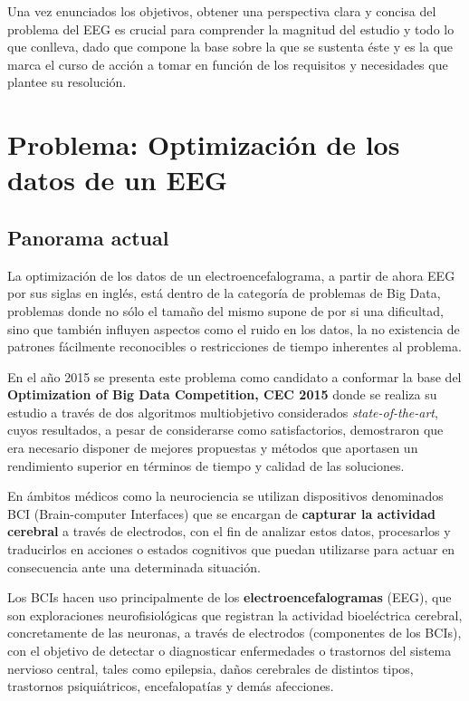 Una vez enunciados los objetivos, obtener una perspectiva clara y concisa del problema del EEG es crucial para comprender la magnitud del estudio y todo lo que conlleva, dado que compone la base sobre la que se sustenta éste y es la que marca el curso de acción a tomar en función de los requisitos y necesidades que plantee su resolución. 

\section{Problema: Optimización de los datos de un EEG}

\subsection{Panorama actual}

La optimización de los datos de un electroencefalograma, a partir de ahora EEG por sus siglas en inglés, está dentro de la categoría de problemas de Big Data, problemas donde no sólo el tamaño del mismo supone de por si una dificultad, sino que también influyen aspectos como el ruido en los datos, la no existencia de patrones fácilmente reconocibles o restricciones de tiempo inherentes al problema.

En el año 2015 se presenta este problema como candidato a conformar la base del \textbf{Optimization of Big Data Competition, CEC 2015}\cite{EvolutionaryBigOpt} donde se realiza su estudio a través de dos algoritmos multiobjetivo considerados \textit{state-of-the-art}, cuyos resultados, a pesar de considerarse como satisfactorios, demostraron que era necesario disponer de mejores propuestas y métodos que aportasen un rendimiento superior en términos de tiempo y calidad de las soluciones.

En ámbitos médicos como la neurociencia se utilizan dispositivos denominados BCI (Brain-computer Interfaces)\cite{BCI} que se encargan de \textbf{capturar la actividad cerebral} a través de electrodos, con el fin de analizar estos datos, procesarlos y traducirlos en acciones o estados cognitivos que puedan utilizarse para actuar en consecuencia ante una determinada situación.

Los BCIs hacen uso principalmente de los \textbf{electroencefalogramas} (EEG), que son exploraciones neurofisiológicas que registran la actividad bioeléctrica cerebral, concretamente de las neuronas, a través de electrodos (componentes de los BCIs), con el objetivo de detectar o diagnosticar enfermedades o trastornos del sistema nervioso central\cite{EEG}, tales como epilepsia, daños cerebrales de distintos tipos, trastornos psiquiátricos, encefalopatías y demás afecciones\cite{EEG2}. 


